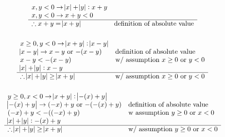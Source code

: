 \documentclass[letterpaper]{article}
\begin{document}
        \subsubsection{}
        	\begin{displaymath}
        		\begin{array}{ll}
        			x, y < 0 \rightarrow \abs{x} + \abs{y}: x + y &\\
                    x, y < 0 \rightarrow x + y < 0 &\\
                    \hline
                    \therefore x + y = \abs{x + y} & $definition of absolute value$\\
        		\end{array}
        	\end{displaymath}
        \subsubsection{}
        	\begin{displaymath}
        		\begin{array}{ll}
                	x \geq 0, y < 0 \rightarrow \abs{x + y}: \abs{x - y} &\\
                    \abs{x - y} \rightarrow x - y $ or $ -(x - y) & $definition of absolute value$\\
                    x - y < -(x - y) &  $w/ assumption $ x \geq 0 $ or $ y < 0\\
                    \abs{x} + \abs{y}: x - y &\\
                    \hline
                    \therefore \abs{x} + \abs{y} \geq \abs{x + y} & $w/ assumption $ x \geq 0 $ or $ y < 0\\ 
                \end{array}
        	\end{displaymath}
        \subsubsection{}
       		\begin{displaymath}
       			\begin{array}{ll}
       				y \geq 0, x < 0 \rightarrow \abs{x + y}: \abs{- (x) + y} &\\
                    \abs{-(x) + y} \rightarrow (-x) + y $ or $ -(-(x) + y) & $definition of absolute value$\\
                    (-x) + y < -((-x) + y) & $w\ assumption $ y \geq 0 $ or $ x < 0\\
                    \abs{x} + \abs{y}: -(x) + y &\\
                    \hline
                    \therefore \abs{x} + \abs{y} \geq \abs{x + y} & $w/ assumption $ y \geq 0 $ or $ x < 0\\ 
       			\end{array}
       		\end{displaymath}
\end{document}
